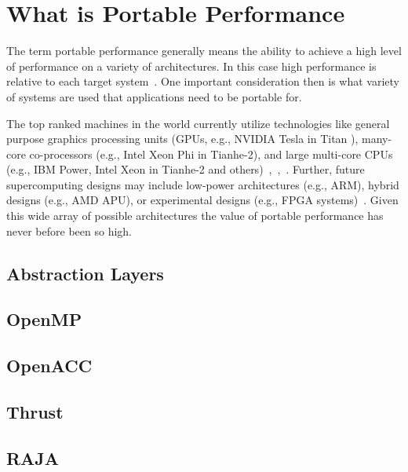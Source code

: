 \section{\textbf{What is Portable Performance}}

The term portable performance generally means the ability to achieve a high level of performance on a variety of architectures.
%
In this case high performance is relative to each target system~\cite{michaelwolfe2016}.
%
One important consideration then is what variety of systems are used that applications need to be portable for. 
%

%
The top ranked machines in the world currently utilize technologies like general purpose graphics processing units (GPUs, e.g., NVIDIA Tesla in Titan ), many-core co-processors (e.g., Intel Xeon Phi in Tianhe-2), and large multi-core CPUs (e.g., IBM Power, Intel Xeon in Tianhe-2 and others)~\cite{michaelwolfe2016},~\cite{top500thelist2016},~\cite{hankchilds2015}. 
%
Further, future supercomputing designs may include low-power architectures (e.g., ARM), hybrid designs (e.g., AMD APU), or experimental designs (e.g., FPGA systems)~\cite{hankchilds2015}. 
%
Given this wide array of possible architectures the value of portable performance has never before been so high.
%

\subsection{ \textbf{Abstraction Layers}}


\subsection*{\textbf{OpenMP}}

\cite{openmp}
\cite{lee2009openmp}
\cite{ayguade2010extending}

\subsection*{\textbf{OpenACC}}

\cite{wienke2012openacc}
\cite{openacc}
\cite{wang2013performance}

\subsection*{\textbf{Thrust}}

\cite{hoberock2008thrust}
\cite{hoberock2010thrust}

\subsection*{\textbf{RAJA}}

